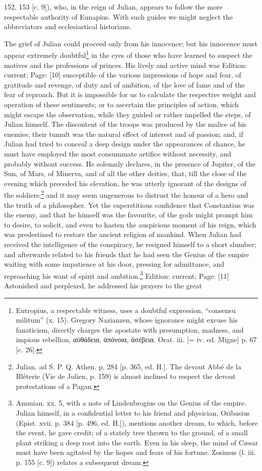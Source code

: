 {152, 153 [c. 9]), who, in the reign of Julian, appears to follow the more respectable authority of Eunapius. With such guides we might neglect the abbreviators and ecclesiastical historians.}

The grief of Julian could proceed only from his innocence; but his innocence must appear extremely doubtful\footnote{Eutropius, a respectable witness, uses a doubtful expression, \texthebrew{“}consensu militum\texthebrew{}” (x. 15). Gregory Nazianzen, whose ignorance might excuse his fanaticism, directly charges the apostate with presumption, madness, and impious rebellion, \textgreek{α\texthebrew{ὐ}θάδεια, \texthebrew{ἀ}πόνοια, \texthebrew{ἀ}σέβεια}. Orat. iii. [= iv. ed. Migne] p. 67 [c. 26].} in the eyes of those who have learned to suspect the motives and the professions of princes. His lively and active mind was Edition: current; Page: [10] susceptible of the various impressions of hope and fear, of gratitude and revenge, of duty and of ambition, of the love of fame and of the fear of reproach. But it is impossible for us to calculate the respective weight and operation of these sentiments; or to ascertain the principles of action, which might escape the observation, while they guided or rather impelled the steps, of Julian himself. The discontent of the troops was produced by the malice of his enemies; their tumult was the natural effect of interest and of passion; and, if Julian had tried to conceal a deep design under the appearances of chance, he must have employed the most consummate artifice without necessity, and probably without success. He solemnly declares, in the presence of Jupiter, of the Sun, of Mars, of Minerva, and of all the other deities, that, till the close of the evening which preceded his elevation, he was utterly ignorant of the designs of the soldiers;\footnote{Julian. ad S. P. Q. Athen. p. 284 [p. 365, ed. H.]. The devout Abbé de la Bléterie (Vie de Julien, p. 159) is almost inclined to respect the devout protestations of a Pagan.} and it may seem ungenerous to distrust the honour of a hero and the truth of a philosopher. Yet the superstitious confidence that Constantius was the enemy, and that he himself was the favourite, of the gods might prompt him to desire, to solicit, and even to hasten the auspicious moment of his reign, which was predestined to restore the ancient religion of mankind. When Julian had received the intelligence of the conspiracy, he resigned himself to a short slumber; and afterwards related to his friends that he had seen the Genius of the empire waiting with some impatience at his door, pressing for admittance, and reproaching his want of spirit and ambition.\footnote{Ammian. xx. 5, with a note of Lindenbrogius on the Genius of the empire. Julian himself, in a confidential letter to his friend and physician, Oribasius (Epist. xvii. p. 384 [p. 496, ed. H.]), mentions another dream, to which, before the event, he gave credit; of a stately tree thrown to the ground, of a small plant striking a deep root into the earth. Even in his sleep, the mind of Cæsar must have been agitated by the hopes and fears of his fortune. Zosimus (l. iii. p. 155 [c. 9]) relates a subsequent dream.} Edition: current; Page: [11] Astonished and perplexed, he addressed his prayers to the great 